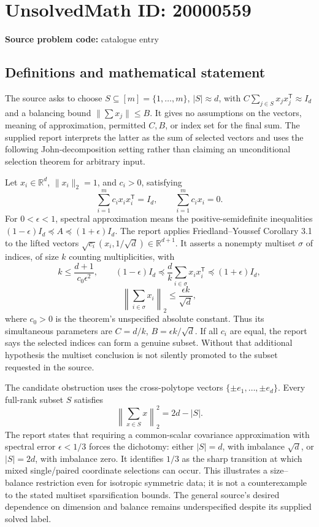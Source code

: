 \documentclass[11pt]{article}
\newcommand{\R}{\mathbb{R}}
\begin{document}
\section*{UnsolvedMath ID: 20000559}
\textbf{Source problem code:} catalogue entry
\subsection{Definitions and mathematical statement}
The source asks to choose \(S\subseteq[m]=\{1,\ldots,m\}\), \(|S|\approx d\), with \(C\sum_{j\in S}x_jx_j^{\mathsf T}\approx I_d\) and a balancing bound \(\|\sum x_j\|\le B\). It gives no assumptions on the vectors, meaning of approximation, permitted \(C,B\), or index set for the final sum. The supplied report interprets the latter as the sum of selected vectors and uses the following John-decomposition setting rather than claiming an unconditional selection theorem for arbitrary input.

Let \(x_i\in\R^d\), \(\|x_i\|_2=1\), and \(c_i>0\), satisfying
\[
 \sum_{i=1}^m c_ix_ix_i^{\mathsf T}=I_d,\qquad
 \sum_{i=1}^m c_ix_i=0.
\]
For \(0<\epsilon<1\), spectral approximation means the positive-semidefinite inequalities \((1-\epsilon)I_d\preceq A\preceq(1+\epsilon)I_d\). The report applies Friedland--Youssef Corollary 3.1 to the lifted vectors \(\sqrt{c_i}(x_i,1/\sqrt d)\in\R^{d+1}\). It asserts a nonempty multiset \(\sigma\) of indices, of size \(k\) counting multiplicities, with
\[
 k\le\frac{d+1}{c_0\epsilon^2},\qquad
 (1-\epsilon)I_d\preceq\frac d k\sum_{i\in\sigma}x_ix_i^{\mathsf T}
 \preceq(1+\epsilon)I_d,
\]
\[
 \left\|\sum_{i\in\sigma}x_i\right\|_2\le\frac{\epsilon k}{\sqrt d},
\]
where \(c_0>0\) is the theorem's unspecified absolute constant. Thus its simultaneous parameters are \(C=d/k\), \(B=\epsilon k/\sqrt d\). If all \(c_i\) are equal, the report says the selected indices can form a genuine subset. Without that additional hypothesis the multiset conclusion is not silently promoted to the subset requested in the source.

The candidate obstruction uses the cross-polytope vectors \(\{\pm e_1,\ldots,\pm e_d\}\). Every full-rank subset \(S\) satisfies
\[
 \left\|\sum_{x\in S}x\right\|_2^2=2d-|S|.
\]
The report states that requiring a common-scalar covariance approximation with spectral error \(\epsilon<1/3\) forces the dichotomy: either \(|S|=d\), with imbalance \(\sqrt d\), or \(|S|=2d\), with imbalance zero. It identifies \(1/3\) as the sharp transition at which mixed single/paired coordinate selections can occur. This illustrates a size--balance restriction even for isotropic symmetric data; it is not a counterexample to the stated multiset sparsification bounds. The general source's desired dependence on dimension and balance remains underspecified despite its supplied solved label.
\end{document}
